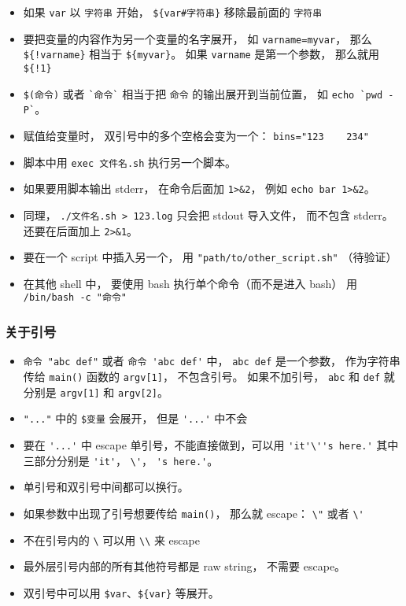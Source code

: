 \begin{itemize}
\item 如果 \verb|var| 以 \verb|字符串| 开始， \verb|${var#字符串}| 移除最前面的 \verb|字符串|
\item 要把变量的内容作为另一个变量的名字展开， 如 \verb|varname=myvar|， 那么 \verb|${!varname}| 相当于 \verb|${myvar}|。 如果 \verb|varname| 是第一个参数， 那么就用 \verb|${!1}|
\item \verb|$(命令)| 或者 \verb|`命令`| 相当于把 \verb|命令| 的输出展开到当前位置， 如 \verb|echo `pwd -P`|。
\item 赋值给变量时， 双引号中的多个空格会变为一个： \verb|bins="123    234"|
\item 脚本中用 \verb|exec 文件名.sh| 执行另一个脚本。
\item 如果要用脚本输出 stderr， 在命令后面加 \verb|1>&2|， 例如 \verb|echo bar 1>&2|。
\item 同理， \verb|./文件名.sh > 123.log| 只会把 stdout 导入文件， 而不包含 stderr。 还要在后面加上 \verb|2>&1|。
\item 要在一个 script 中插入另一个， 用 \verb|"path/to/other_script.sh"| （待验证）
\item 在其他 shell 中， 要使用 bash 执行单个命令（而不是进入 bash） 用 \verb|/bin/bash -c "命令"|
\end{itemize}

\subsubsection{关于引号}
\begin{itemize}
\item \verb|命令 "abc def"| 或者 \verb|命令 'abc def'| 中， \verb|abc def| 是一个参数， 作为字符串传给 \verb|main()| 函数的 \verb|argv[1]|， 不包含引号。 如果不加引号， \verb|abc| 和 \verb|def| 就分别是 \verb|argv[1]| 和 \verb|argv[2]|。
\item \verb|"..."| 中的 \verb|$变量| 会展开， 但是 \verb|'...'| 中不会
\item 要在 \verb|'...'| 中 escape 单引号，不能直接做到，可以用 \verb|'it'\''s here.'| 其中三部分分别是 \verb|'it'|， \verb|\'|， \verb|'s here.'|。
\item 单引号和双引号中间都可以换行。
\item 如果参数中出现了引号想要传给 \verb|main()|， 那么就 escape： \verb|\"| 或者 \verb|\'|
\item 不在引号内的 \verb|\| 可以用 \verb|\\| 来 escape
\item 最外层引号内部的所有其他符号都是 raw string， 不需要 escape。
\item 双引号中可以用 \verb|$var|、\verb|${var}| 等展开。
\end{itemize}

